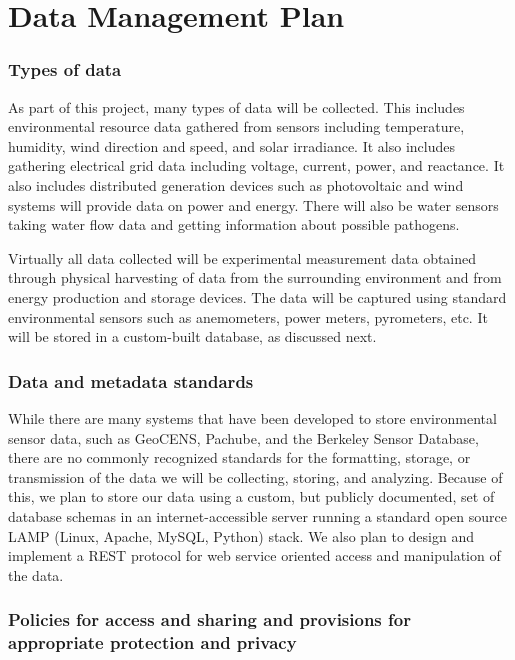 \documentclass{proposalnsf}
\begin{document}
\section*{Data Management Plan}

\subsubsection*{Types of data}

As part of this project, many types of data will be collected.  This
includes environmental resource data gathered from sensors including
temperature, humidity, wind direction and speed, and solar irradiance. It
also includes gathering electrical grid data including voltage, current,
power, and reactance.  It also includes distributed generation devices such
as photovoltaic and wind systems will provide data on power and energy.
There will also be water sensors taking water flow data and getting
information about possible pathogens.

Virtually all data collected will be experimental measurement data obtained
through physical harvesting of data from the surrounding environment and
from energy production and storage devices.  The data will be captured
using standard environmental sensors such as anemometers, power meters,
pyrometers, etc.  It will be stored in a custom-built database, as
discussed next.

\subsubsection*{Data and metadata standards}

While there are many systems that have been developed to store
environmental sensor data, such as GeoCENS, Pachube, and the Berkeley
Sensor Database, there are no commonly recognized standards for the
formatting, storage, or transmission of the data we will be collecting,
storing, and analyzing.  Because of this, we plan to store our data using a
custom, but publicly documented, set of database schemas in an
internet-accessible server running a standard open source LAMP (Linux,
Apache, MySQL, Python) stack.  We also plan to design and implement a REST
protocol for web service oriented access and manipulation of the data.

\subsubsection*{Policies for access and sharing and provisions for appropriate protection and privacy}
\end{document}

